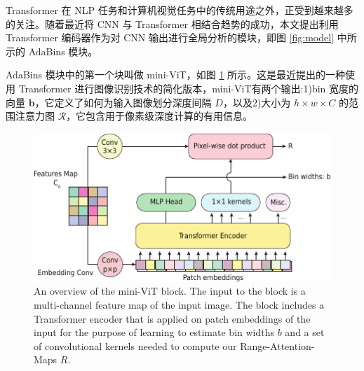 \documentclass{vip-theme}
\begin{document}
Transformer 在 NLP 任务和计算机视觉任务中的传统用途之外，正受到越来越多的关注。随着最近将 CNN 与 Transformer 相结合趋势的成功，本文提出利用 Transformer 编码器作为对 CNN 输出进行全局分析的模块，即图 \ref{fig:model} 中所示的 AdaBins 模块。

AdaBins 模块中的第一个块叫做 mini-ViT，如图 \ref{fig:vit} 所示。这是最近提出的一种使用 Transformer 进行图像识别技术的简化版本，mini-ViT有两个输出:1)bin 宽度的向量 $\textbf{b}$，它定义了如何为输入图像划分深度间隔 $D$，以及2)大小为 $h \times w \times C$ 的范围注意力图 $\mathcal{R}$，它包含用于像素级深度计算的有用信息。

\begin{table}[!htbp]
\centering
\caption{Mini-ViT architecture details.}
\label{tab:arch-mvit}
\end{table}


\begin{figure}[!htbp]
\centering
	\includegraphics[width=.7\paperwidth]{figure/mViT_v6}
	\caption{An overview of the mini-ViT block. The input to the block is a multi-channel feature map of the input image. The block includes a Transformer encoder that is applied on patch embeddings of the input for the purpose of learning to estimate bin widths $b$ and a set of convolutional kernels needed to compute our Range-Attention-Maps $R$.}
	\label{fig:vit}
\end{figure}
\end{document}
